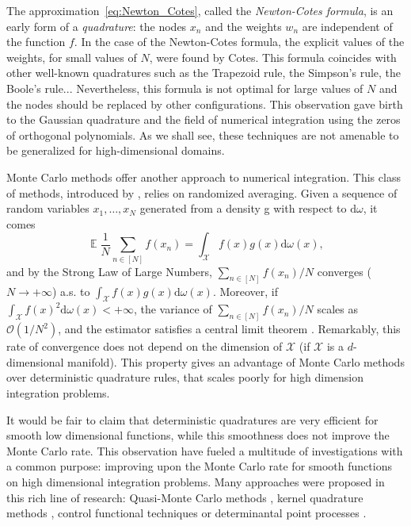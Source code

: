 \documentclass[twoside,11pt]{book}
\numberwithin{theorem}{chapter}
\numberwithin{definition}{chapter}
\numberwithin{proposition}{chapter}
\numberwithin{corollary}{chapter}
\numberwithin{example}{chapter}
\numberwithin{lemma}{chapter}
\DeclareMathOperator{\EX}{\mathbb{E}}
\begin{document}
The approximation~\eqref{eq:Newton_Cotes}, called the \emph{Newton-Cotes formula}, is an early form of a \emph{quadrature}: the nodes $x_{n}$ and the weights $w_{n}$ are independent of the function $f$. In the case of the Newton-Cotes formula, the explicit values of the weights, for small values of $N$, were found by Cotes. This formula coincides with other well-known quadratures such as the Trapezoid rule, the Simpson's rule, the Boole's rule... Nevertheless, this formula is not optimal for large values of $N$ and the nodes should be replaced by other configurations. This observation gave birth to the Gaussian quadrature and the field of numerical integration using the zeros of orthogonal polynomials.
As we shall see, these techniques are not amenable to be generalized for  high-dimensional domains.

Monte Carlo methods offer another approach to numerical integration. This class of methods, introduced by \cite{MeUl49},  relies on randomized averaging. Given a sequence of random variables $x_{1}, \dots, x_{N}$ generated from a density g with respect to $\mathrm{d}\omega$, it comes
\begin{equation}
\EX \frac{1}{N}\sum\limits_{n \in [N]} f(x_{n}) = \int_{\mathcal{X}} f(x)g(x) \mathrm{d}\omega(x),
\end{equation}
and by the Strong Law of Large Numbers, $ \sum_{n \in [N]} f(x_{n})/N$ converges ($N \rightarrow +\infty$) a.s. to $\displaystyle \int_{\mathcal{X}} f(x)g(x) \mathrm{d}\omega(x)$. Moreover, if $\displaystyle \int_{\mathcal{X}} f(x)^{2} \mathrm{d}\omega(x) < +\infty$, the variance of $\sum_{n \in [N]} f(x_{n})/N$ scales as $\mathcal{O}(1/N^{2})$, and the estimator satisfies a central limit theorem \citep{RoCa04}. 
Remarkably, this rate of convergence does not depend on the dimension of $\mathcal{X}$ (if $\mathcal{X}$ is a $d$-dimensional manifold). This property gives an advantage of Monte Carlo methods over deterministic quadrature rules, that scales poorly for high dimension integration problems. 

It would be fair to claim that deterministic quadratures are very efficient for smooth low dimensional functions, while this smoothness does not improve the Monte Carlo rate. This observation have fueled a multitude of investigations with a common purpose: improving upon the Monte Carlo rate for smooth functions on high dimensional integration problems. Many approaches were proposed in this rich line of research: Quasi-Monte Carlo methods \citep*{DiPi10}, kernel quadrature methods \citep*{Hic98} \citep{SmGrSoSc07} \citep{ChWeSm10}, control functional techniques \citep*{OaGi16} or  determinantal point processes \citep{BaHa16}.
\end{document}

